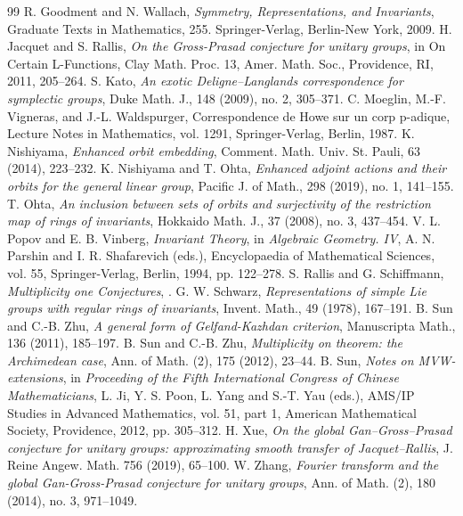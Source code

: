 \documentclass[12pt]{amsart}
\theoremstyle{definition}
\theoremstyle{remark}\newtheorem{rmk}[lm]{Remark}
\begin{document}
\begin{thebibliography}{99}
		R. Goodment and N. Wallach, \textit{Symmetry, Representations, and Invariants}, Graduate Texts in Mathematics, 255. Springer-Verlag, Berlin-New York, 2009.
        H. Jacquet and S. Rallis, \textit{On the Gross-Prasad conjecture for unitary groups}, in On Certain L-Functions, Clay Math. Proc. 13, Amer. Math. Soc., Providence, RI, 2011, 205–264.
		S. Kato, \textit{An exotic Deligne–Langlands correspondence for symplectic groups}, Duke Math. J., 148 (2009), no. 2, 305--371.
		C. Moeglin, M.-F. Vigneras, and J.-L. Waldspurger, Correspondence de Howe sur un corp p-adique, Lecture Notes in Mathematics, vol. 1291, Springer-Verlag, Berlin, 1987.
		K. Nishiyama, \textit{Enhanced orbit embedding}, Comment. Math. Univ. St. Pauli, 63 (2014), 223--232.
		K. Nishiyama and T. Ohta, \textit{Enhanced adjoint actions and their orbits for the general linear group}, Pacific J. of Math., 298 (2019), no. 1, 141--155.
        T. Ohta, \textit{An inclusion between sets of orbits and surjectivity of the restriction map of rings of invariants}, Hokkaido Math. J., 37 (2008), no. 3, 437–454.
		V. L. Popov and E. B. Vinberg, \textit{Invariant Theory}, in \textit{Algebraic Geometry. IV}, A. N. Parshin and I. R. Shafarevich (eds.), Encyclopaedia of Mathematical Sciences, vol. 55, Springer-Verlag, Berlin, 1994, pp. 122--278.
		S. Rallis and G. Schiffmann, \textit{Multiplicity one Conjectures}, .
		G. W. Schwarz, \textit{Representations of simple Lie groups with regular rings of invariants}, Invent. Math., 49 (1978), 167--191.
        B. Sun and C.-B. Zhu, \textit{A general form of Gelfand-Kazhdan criterion}, Manuscripta Math., 136 (2011), 185--197.
		B. Sun and C.-B. Zhu, \textit{Multiplicity on theorem: the Archimedean case}, Ann. of Math. (2), 175 (2012), 23--44.
		B. Sun, \textit{Notes on MVW-extensions}, in \textit{Proceeding of the Fifth International Congress of Chinese Mathematicians}, L. Ji, Y. S. Poon, L. Yang and S.-T. Yau (eds.), AMS/IP Studies in Advanced Mathematics, vol. 51, part 1, American Mathematical Society, Providence, 2012, pp. 305--312.
		H. Xue, \textit{On the global Gan--Gross--Prasad conjecture for unitary groups: approximating smooth transfer of Jacquet--Rallis}, J. Reine Angew. Math. 756 (2019), 65--100.
		W. Zhang, \textit{Fourier transform and the global Gan-Gross-Prasad conjecture for unitary groups}, Ann. of Math. (2), 180 (2014), no. 3, 971--1049. 
	\end{thebibliography}
\end{document}
